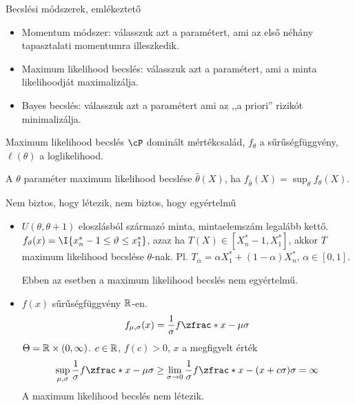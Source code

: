 \documentclass[aspectratio=169,notheorems,9pt,\option]{beamer}
\begin{document}
\maketitle

\begin{frame}{Becslési módszerek, emlékeztető}
  \begin{itemize}    
    \item Momentum módszer: válasszuk azt a paramétert, ami az első néhány tapasztalati momentumra illeszkedik.
    \item Maximum likelihood becslés: válasszuk azt a paramétert, ami a minta likelihoodját maximalizálja.
    \item Bayes becslés: válasszuk azt a paramétert ami az ,,a priori'' rizikót minimalizálja.
  \end{itemize}  
\end{frame}

\begin{frame}{Maximum likelihood becslés}
    $\cP$ dominált mértékcsalád, $f_\theta$ a sűrűségfüggvény,
    $\ell (\theta)$ a loglikelihood.
    \begin{df}
      A $\theta$ paraméter maximum likelihood becslése $\hat\theta (X)$,
      ha $f_{\hat{\theta}} (X)=\sup_{\theta}f_{\theta} (X)$.
    \end{df}
    Nem biztos, hogy létezik, nem biztos, hogy egyértelmű  
    \begin{itemize}
    \item $U (\theta,\theta+1)$ eloszlásból származó minta, mintaelemszám legalább kettő. 
    $f_\theta (x)=\I{x_n^*-1\leq \theta\leq x_1^*}$, azaz ha  
    $T (X)\in [X_n^*-1,X_1^*]$, akkor $T$ maximum likelihood becslése
      $\theta$-nak. Pl. $T_\alpha=\alpha X_1^*+(1-\alpha)X_n^*$, $\alpha\in[0,1]$.

      Ebben az esetben a maximum likelihood becslés nem egyértelmű.
  
    \item $f (x)$ sűrűségfüggvény $\mathbb{R}$-en.
      $$f_{\mu,\sigma}
      (x)=\frac{1}\sigma f \zfrac*{x-\mu}{\sigma}
      $$
      $\Theta=\mathbb{R}\times (0,\infty)$. $c\in\mathbb{R}$, $f (c)>0$, $x$ a
      megfigyelt érték
      \begin{displaymath}
        \sup_{\mu,\sigma}\frac{1}{\sigma}f \zfrac*{x-\mu}{\sigma}\geq
        \lim_{\sigma\to0}\frac{1}{\sigma} f\zfrac*{x- (x+c\sigma)}{\sigma}=\infty
      \end{displaymath}
      A maximum likelihood becslés nem létezik.
    \end{itemize}  
  \end{frame}
\end{document}
